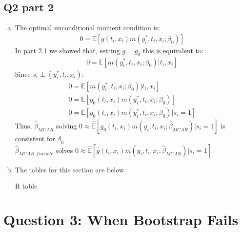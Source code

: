 \documentclass[11pt]{article}
\begin{document}
\subsection{Q2 part 2}
\begin{enumerate}[(a)]
	\item The optimal unconditional moment condition is:
	\begin{align*}
	0 = \mathbb{E}[g(t_i, x_i)m(y_i^*, t_i, x_i; \beta_0)]
	\end{align*}
	In part 2.1 we showed that, setting $g=g_0$ this is equivalent to:
	\begin{align*}
	0 = \mathbb{E}[m(y_i^*, t_i, x_i; \beta_0)|t_i,x_i]
	\end{align*}
	Since $s_i  \perp (y_i^*,t_i,x_i)$:
	\begin{align*}
	0 = \mathbb{E}[m(y_i^*, t_i, x_i; \beta_0)|t_i,x_i]\\
	0 = \mathbb{E}[g_0(t_i, x_i)m(y_i^*, t_i, x_i; \beta_0)]\\
	0 = \mathbb{E}[g_0(t_i, x_i)m(y_i^*, t_i, x_i; \beta_0) | s_i=1]
	\end{align*}
	Thus, $\hat{\beta}_{MCAR}$ solving $0 \approx \hat{\mathbb{E}}[g_0(t_i,x_i)m(y_i, t_i, x_i; \hat{\beta}_{MCAR})|s_i=1]$ is consistent for $\beta_0$\\
	$\hat{\beta}_{MCAR,feasible}$ solves $0 \approx \hat{\mathbb{E}}[\hat{g}(t_i,x_i)m(y_i, t_i, x_i; \hat{\beta}_{MCAR})|s_i=1]$
	
	\item The tables for this section are below \\
	
	\centerline{R table }
	\begin{center}
		
	\end{center}
	
\end{enumerate}


\section{Question 3: When Bootstrap Fails}
\end{document}
